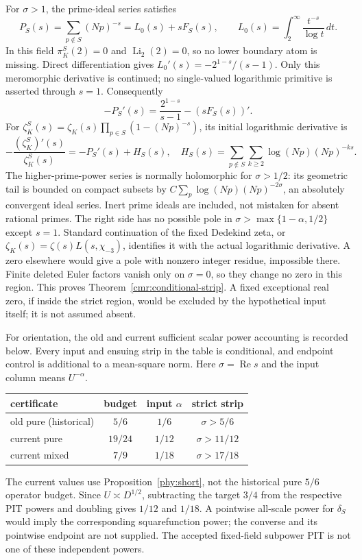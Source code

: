 For $\sigma>1$, the prime-ideal series satisfies
\[
 P_S(s)=\sum_{p\notin S}(Np)^{-s}
       =L_0(s)+sF_S(s),\qquad
 L_0(s)=\int_2^\infty\frac{t^{-s}}{\log t}\,dt.
\]
In this field $\pi_K^S(2)=0$ and $\operatorname{Li}_2(2)=0$, so no
lower boundary atom is missing. Direct differentiation gives
$L_0'(s)=-2^{1-s}/(s-1)$. Only this meromorphic derivative is
continued; no single-valued logarithmic primitive is asserted through
$s=1$. Consequently
\[
 -P_S'(s)=\frac{2^{1-s}}{s-1}-(sF_S(s))'.
\]
For $\zeta_K^S(s)=\zeta_K(s)\prod_{p\in S}(1-(Np)^{-s})$, its
initial logarithmic derivative is
\[
 -\frac{(\zeta_K^S)'(s)}{\zeta_K^S(s)}
   =-P_S'(s)+H_S(s),\quad
 H_S(s)=\sum_{p\notin S}\sum_{k\ge2}
                          \log(Np)(Np)^{-ks}.
\]
The higher-prime-power series is normally holomorphic for
$\sigma>1/2$: its geometric tail is bounded on compact subsets by
$C\sum_p\log(Np)(Np)^{-2\sigma}$, an absolutely convergent ideal
series. Inert prime ideals are included, not mistaken for absent
rational primes. The right side has no possible pole in
$\sigma>\max\{1-\alpha,1/2\}$ except $s=1$.
Standard continuation of the fixed Dedekind zeta, or
$\zeta_K(s)=\zeta(s)L(s,\chi_{-3})$, identifies it with the actual
logarithmic derivative. A zero elsewhere would give a pole with
nonzero integer residue, impossible there. Finite deleted Euler
factors vanish only on $\sigma=0$, so they change no zero in this
region. This proves Theorem~\ref{cmr:conditional-strip}.
A fixed exceptional real zero, if inside the strict region, would be
excluded by the hypothetical input itself; it is not assumed absent.

For orientation, the old and current sufficient scalar power accounting
is recorded below. Every input and ensuing strip in the table is
conditional, and endpoint control is additional to a mean-square norm.
Here $\sigma=\operatorname{Re}s$ and the input column means $U^{-\alpha}$.
\begin{center}
\begin{tabular}{lccc}
certificate & budget & input $\alpha$ & strict strip\\
\hline
old pure (historical) & $5/6$ & $1/6$ & $\sigma>5/6$\\
current pure & $19/24$ & $1/12$ & $\sigma>11/12$\\
current mixed & $7/9$ & $1/18$ & $\sigma>17/18$
\end{tabular}
\end{center}
The current values use Proposition~\ref{phy:short}, not the historical pure
$5/6$ operator budget. Since $U\asymp D^{1/2}$, subtracting the
target $3/4$ from the respective PIT powers and doubling gives
$1/12$ and $1/18$. A pointwise all-scale power for $\delta_S$ would
imply the corresponding squarefunction power; the converse and its
pointwise endpoint are not supplied. The accepted fixed-field
subpower PIT is not one of these independent powers.

